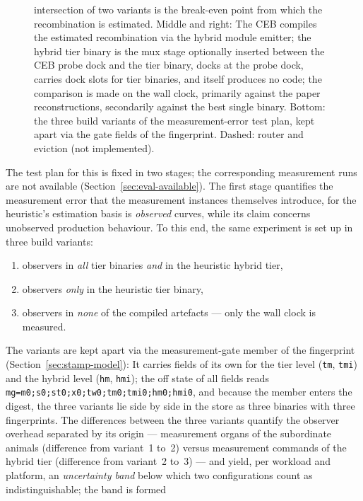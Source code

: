 \begin{nurkurz}
\begin{figure}[htbp]
{intersection of two variants is the break-even point from which the recombination is estimated.
Middle and right: The CEB compiles the estimated recombination via the hybrid module emitter; the
hybrid tier binary is the mux stage optionally inserted between the CEB probe dock and the tier binary,
docks at the probe dock, carries dock slots for tier binaries, and itself produces no code; the
comparison is made on the wall clock, primarily against the paper reconstructions,
secondarily against the best single binary. Bottom: the three build variants of the
measurement-error test plan, kept apart via the gate fields of the fingerprint. Dashed: router and
eviction (not implemented).}\label{fig:eval-messkurven}
\end{figure}
\end{nurkurz}

\begin{nurlang}
The test plan for this is fixed in two stages; the corresponding measurement runs are not available
(Section~\ref{sec:eval-available}). The first stage quantifies the measurement error that the
measurement instances themselves introduce, for the heuristic's estimation basis is \emph{observed}
curves, while its claim concerns unobserved production behaviour. To this end, the same experiment is
set up in three build variants:
\begin{enumerate}
  \item observers in \emph{all} tier binaries \emph{and} in the heuristic hybrid tier,
  \item observers \emph{only} in the heuristic tier binary,
  \item observers in \emph{none} of the compiled artefacts --- only the wall clock is measured.
\end{enumerate}
The variants are kept apart via the measurement-gate member of the fingerprint
(Section~\ref{sec:stamp-model}): It carries fields of its own for the tier level (\texttt{tm},
\texttt{tmi}) and the hybrid level (\texttt{hm}, \texttt{hmi}); the off state of all fields reads
\texttt{mg=m0;s0;st0;x0;tw0;tm0;tmi0;hm0;hmi0}, and because the member enters the digest, the three
variants lie side by side in the store as three binaries with three fingerprints. The differences
between the three variants quantify the observer overhead separated by its origin --- measurement
organs of the subordinate animals (difference from variant~1 to~2) versus measurement commands of the
hybrid tier (difference from variant~2 to~3) --- and yield, per workload and platform, an
\emph{uncertainty band} below which two configurations count as indistinguishable; the band is formed

\end{nurlang}

